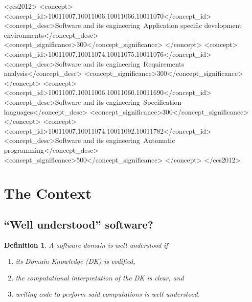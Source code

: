 \documentclass[sigconf,review,anonymous=false]{acmart}
\begin{document}
\begin{CCSXML}
<ccs2012>
   <concept>
       <concept_id>10011007.10011006.10011066.10011070</concept_id>
       <concept_desc>Software and its engineering~Application specific development environments</concept_desc>
       <concept_significance>300</concept_significance>
       </concept>
   <concept>
       <concept_id>10011007.10011074.10011075.10011076</concept_id>
       <concept_desc>Software and its engineering~Requirements analysis</concept_desc>
       <concept_significance>300</concept_significance>
       </concept>
   <concept>
       <concept_id>10011007.10011006.10011060.10011690</concept_id>
       <concept_desc>Software and its engineering~Specification languages</concept_desc>
       <concept_significance>300</concept_significance>
       </concept>
   <concept>
       <concept_id>10011007.10011074.10011092.10011782</concept_id>
       <concept_desc>Software and its engineering~Automatic programming</concept_desc>
       <concept_significance>500</concept_significance>
       </concept>
 </ccs2012>
\end{CCSXML}



\newtheorem{defn}{Definition}

\maketitle

\section{The Context}
\subsection{``Well understood'' software?}\label{ch:wellUnderstood}

\begin{defn}
A software domain is \emph{well understood} if
\begin{enumerate}
\item its Domain Knowledge (DK) is codified,
\item the computational interpretation of the DK is clear, and
\item writing code to perform said computations is well understood.
\end{enumerate}
\end{defn}
\end{document}
